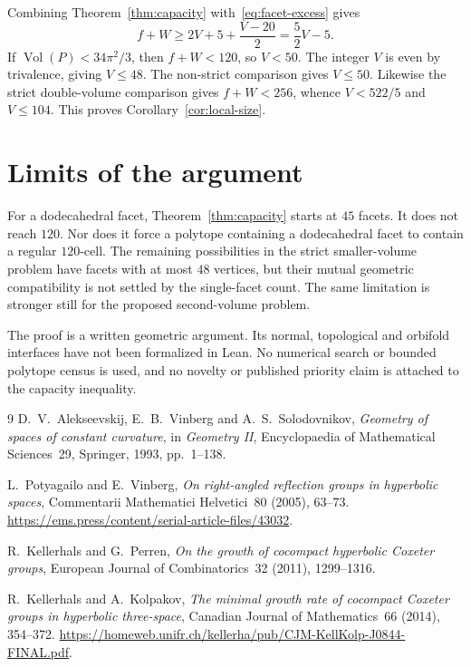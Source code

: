\documentclass[11pt]{article}
\theoremstyle{remark}
\newcommand{\Vol}{\operatorname{Vol}}
\begin{document}
Combining Theorem~\ref{thm:capacity} with~\eqref{eq:facet-excess} gives
\[
 f+W\ge2V+5+\frac{V-20}{2}=\frac52V-5.
\]
If $\Vol(P)<34\pi^2/3$, then $f+W<120$, so $V<50$.
The integer $V$ is even by trivalence, giving $V\le48$. The non-strict
comparison gives $V\le50$. Likewise the strict double-volume comparison
gives $f+W<256$, whence $V<522/5$ and $V\le104$. This proves
Corollary~\ref{cor:local-size}.

\section{Limits of the argument}

For a dodecahedral facet, Theorem~\ref{thm:capacity} starts at $45$
facets. It does not reach $120$. Nor does it force a polytope containing
a dodecahedral facet to contain a regular $120$-cell. The remaining
possibilities in the strict smaller-volume problem have facets with at
most $48$ vertices, but their mutual geometric compatibility is not
settled by the single-facet count. The same limitation is stronger still
for the proposed second-volume problem.

The proof is a written geometric argument. Its normal, topological and
orbifold interfaces have not been formalized in Lean. No numerical
search or bounded polytope census is used, and no novelty or published
priority claim is attached to the capacity inequality.

\begin{thebibliography}{9}
D.~V.~Alekseevskij, E.~B.~Vinberg and A.~S.~Solodovnikov,
\emph{Geometry of spaces of constant curvature}, in
\emph{Geometry II}, Encyclopaedia of Mathematical Sciences~29,
Springer, 1993, pp.~1--138.

L.~Potyagailo and E.~Vinberg,
\emph{On right-angled reflection groups in hyperbolic spaces},
Commentarii Mathematici Helvetici~80 (2005), 63--73.
\url{https://ems.press/content/serial-article-files/43032}.

R.~Kellerhals and G.~Perren,
\emph{On the growth of cocompact hyperbolic Coxeter groups},
European Journal of Combinatorics~32 (2011), 1299--1316.

R.~Kellerhals and A.~Kolpakov,
\emph{The minimal growth rate of cocompact Coxeter groups in hyperbolic
three-space}, Canadian Journal of Mathematics~66 (2014), 354--372.
\url{https://homeweb.unifr.ch/kellerha/pub/CJM-KellKolp-J0844-FINAL.pdf}.
\end{thebibliography}
\end{document}
